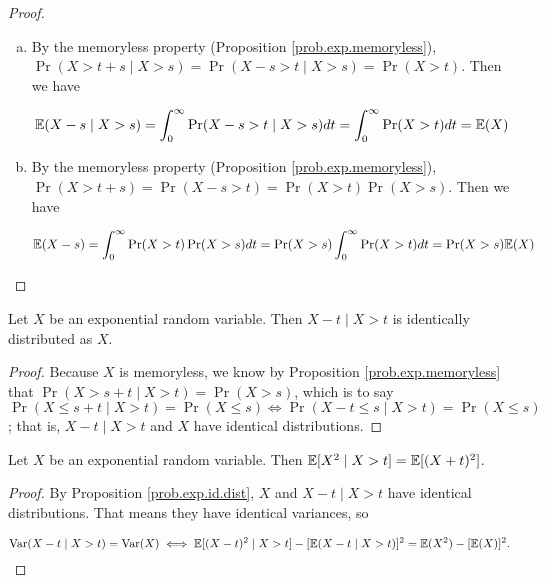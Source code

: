 \begin{itemize}
\begin{proposition}
\end{proposition}

\begin{proof} \begin{enumerate}[(a)]

\item By the memoryless property (Proposition \ref{prob.exp.memoryless}), \( \Pr(X > t + s \mid X > s) =  \Pr(X - s > t  \mid X > s) = \Pr(X > t) \). Then we have

\[
\mathbb{E}(X - s \mid X > s) = \int_0^\infty \Pr(X - s > t  \mid X > s) dt = \int_0^\infty \Pr(X > t)  dt = \mathbb{E}(X)
\]

\item By the memoryless property (Proposition \ref{prob.exp.memoryless}), \( \Pr(X > t + s ) =  \Pr(X - s > t ) = \Pr(X > t) \Pr( X > s) \). Then we have

\[
\mathbb{E}(X - s ) = \int_0^\infty \Pr(X > t) \Pr( X > s)  dt = \Pr( X > s) \int_0^\infty \Pr(X > t)   dt = \Pr (X > s) \mathbb{E}(X)
\]

\end{enumerate}
\end{proof}

\begin{proposition}\label{prob.exp.id.dist} Let \(X\) be an exponential random variable. Then \(X - t \mid X > t\) is identically distributed as \(X\).

\end{proposition}

\begin{proof} Because \(X\) is memoryless, we know by Proposition \ref{prob.exp.memoryless} that \(\Pr(X > s+t \mid X > t) = \Pr(X > s)\), which is to say \(\Pr(X \leq s + t \mid X > t) = \Pr(X \leq s) \iff \Pr(X- t \leq s  \mid X > t) = \Pr(X \leq s)  \); that is, \(X - t \mid X > t\) and \(X\) have identical distributions. 

\end{proof}


\begin{proposition} Let \(X\) be an exponential random variable. Then \( \mathbb{E}[X^2 \mid X >t ] = \mathbb{E}[(X + t)^2]\).

\end{proposition}


\begin{proof} By Proposition \ref{prob.exp.id.dist}, \(X\) and \(X - t \mid X > t\) have identical distributions. That means they have identical variances, so 

\[
\mathrm{Var}(X - t \mid X > t) = \mathrm{Var}(X) \iff \mathbb{E}[(X-t)^2 \mid X > t] - [\mathbb{E}(X-t \mid X > t)]^2 = \mathbb{E}(X^2)- [\mathbb{E}(X)]^2.
\]


\end{proof}
\end{itemize}
